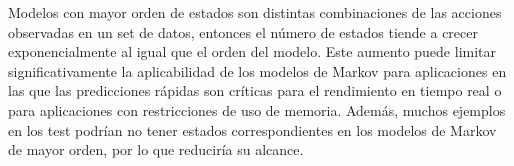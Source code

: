 Modelos con mayor orden de estados son distintas combinaciones de las acciones observadas en un set de datos, entonces el número de estados tiende a crecer exponencialmente al igual que el orden del modelo. 
Este aumento puede limitar significativamente la aplicabilidad de los modelos de Markov para aplicaciones en las que las predicciones rápidas son críticas para el rendimiento en tiempo real o para aplicaciones con restricciones de uso de memoria. Además, muchos ejemplos en los test podrían no tener estados correspondientes en los modelos de Markov de mayor orden, por lo que reduciría su alcance.

